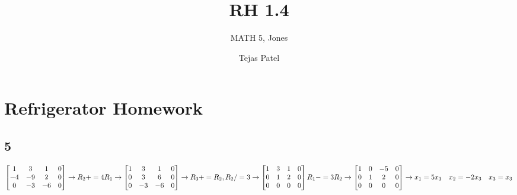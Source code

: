 \documentclass{article}
\title{RH 1.4}
\author{MATH 5, Jones}
\date{Tejas Patel}
\begin{document}
\maketitle
\section*{Refrigerator Homework}
\subsection*{5}
$
\begin{bmatrix}1&3&1&0\\-4&-9&2&0\\0&-3&-6&0\end{bmatrix} \rightarrow R_2+=4R_1 \rightarrow \begin{bmatrix}1&3&1&0\\0&3&6&0\\0&-3&-6&0\end{bmatrix}\rightarrow R_3+=R_2, R_2/=3\rightarrow \begin{bmatrix}1&3&1&0\\0&1&2&0\\0&0&0&0\end{bmatrix}
\\[0.1in] R_1-=3R_2 \rightarrow \begin{bmatrix}1&0&-5&0\\0&1&2&0\\0&0&0&0\end{bmatrix}
\rightarrow x_1=5x_3 \quad x_2=-2x_3 \quad x_3=x_3 
$  
\end{document}
